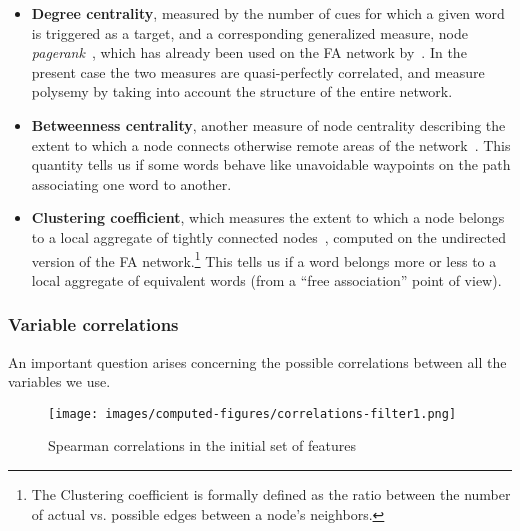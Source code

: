 \begin{itemize}
    \item \textbf{Degree centrality}, measured by the number of cues for which a given word is triggered as a target, and a corresponding generalized measure, node \emph{pagerank}~\citep{Page99}, which has already been used on the FA network by~\citet{Griffiths07}.
    In the present case the two measures are quasi-perfectly correlated, and measure polysemy by taking into account the structure of the entire network.
    \item \textbf{Betweenness centrality}, another measure of node centrality describing the extent to which a node connects otherwise remote areas of the network~\citep{free:set}.
    This quantity tells us if some words behave like unavoidable waypoints on the path associating one word to another.
    \item \textbf{Clustering coefficient}, which measures the extent to which a node belongs to a local aggregate of tightly connected nodes~\cite{watt-coll}, computed on the undirected version of the FA network.\footnote{The Clustering coefficient is formally defined as the ratio between the number of actual vs. possible edges between a node's neighbors.}
    This tells us if a word belongs more or less to a local aggregate of equivalent words (from a ``free association'' point of view).
\end{itemize}

\subsubsection{Variable correlations}

An important question arises concerning the possible correlations between all the variables we use.

\begin{figure}[!th]
    \centering
    \texttt{[image: images/computed-figures/correlations-filter1.png]}
    \caption{Spearman correlations in the initial set of features}
    \label{fig:feature-corrs-initial}
\end{figure}


